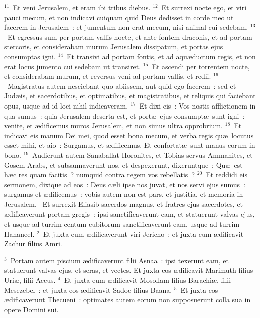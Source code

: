 ${}^{11}$~Et veni Jerusalem, et eram ibi tribus diebus.
${}^{12}$~Et surrexi nocte ego, et viri pauci mecum, et non indicavi cuiquam quid Deus dedisset in corde meo ut facerem in Jerusalem~: et jumentum non erat mecum, nisi animal cui sedebam.
${}^{13}$~Et egressus sum per portam vallis nocte, et ante fontem draconis, et ad portam stercoris, et considerabam murum Jerusalem dissipatum, et portas ejus consumptas igni.
${}^{14}$~Et transivi ad portam fontis, et ad aqu\ae ductum regis, et non erat locus jumento cui sedebam ut transiret.
${}^{15}$~Et ascendi per torrentem nocte, et considerabam murum, et reversus veni ad portam vallis, et redii.
${}^{16}$~Magistratus autem nesciebant quo abiissem, aut quid ego facerem~: sed et Jud\ae is, et sacerdotibus, et optimatibus, et magistratibus, et reliquis qui faciebant opus, usque ad id loci nihil indicaveram.
${}^{17}$~Et dixi eis~: Vos nostis afflictionem in qua sumus~: quia Jerusalem deserta est, et port\ae\ ejus consumpt\ae\ sunt igni~: venite, et \ae dificemus muros Jerusalem, et non simus ultra opprobrium.
${}^{18}$~Et indicavi eis manum Dei mei, quod esset bona mecum, et verba regis qu\ae\ locutus esset mihi, et aio~: Surgamus, et \ae dificemus. Et confortat\ae\ sunt manus eorum in bono.
${}^{19}$~Audierunt autem Sanaballat Horonites, et Tobias servus Ammanites, et Gosem Arabs, et subsannaverunt nos, et despexerunt, dixeruntque~: Qu\ae\ est h\ae c res quam facitis~? numquid contra regem vos rebellatis~?
${}^{20}$~Et reddidi eis sermonem, dixique ad eos~: Deus c\ae li ipse nos juvat, et nos servi ejus sumus~: surgamus et \ae dificemus~: vobis autem non est pars, et justitia, et memoria in Jerusalem.
~\lettrine[lines=10,image=true,loversize=0.05,lraise=-0.03]{E}{}t surrexit Eliasib sacerdos magnus, et fratres ejus sacerdotes, et \ae dificaverunt portam gregis~: ipsi sanctificaverunt eam, et statuerunt valvas ejus, et usque ad turrim centum cubitorum sanctificaverunt eam, usque ad turrim Hananeel.
${}^{2}$~Et juxta eum \ae dificaverunt viri Jericho~: et juxta eum \ae dificavit Zachur filius Amri.


${}^{3}$~Portam autem piscium \ae dificaverunt filii Asnaa~: ipsi texerunt eam, et statuerunt valvas ejus, et seras, et vectes. Et juxta eos \ae dificavit Marimuth filius Uri\ae , filii Accus.
${}^{4}$~Et juxta eum \ae dificavit Mosollam filius Barachi\ae , filii Mesezebel~: et juxta eos \ae dificavit Sadoc filius Baana.
${}^{5}$~Et juxta eos \ae dificaverunt Thecueni~: optimates autem eorum non supposuerunt colla sua in opere Domini sui.


